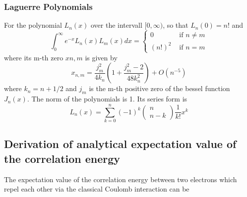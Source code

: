 \documentclass[%
reprint,
amsmath,amssymb,
aps,
]{revtex4-1}
\begin{document}
\subsubsection{Laguerre Polynomials}
For the polynomial $L_n(x)$ over the intervall $[0,\infty)$, so that $L_n(0) = n!$ and
\begin{equation}
\int_{0}^{\infty} e^{-x} L_{n}(x) L_{m}(x) d x=\left\{\begin{array}{ll}{0} & {\text { if } n \neq m} \\ {(n !)^{2}} & {\text { if } n=m}\end{array}\right.
\end{equation}
where its m-th zero $xn,m$ is given by 
\begin{equation}
x_{n, m}=\frac{j_{m}^{2}}{4 k_{n}}\left(1+\frac{j_{m}^{2}-2}{48 k_{n}^{2}}\right)+O\left(n^{-5}\right)
\end{equation}
where $k_n = n + 1/2$ and $j_m$ is the m-th positive zero of the bessel function $J_n(x)$. The norm of the polynomials is 1. 
Its series form is
\begin{equation}
L_{n}(x)=\sum_{k=0}^{n}(-1)^{k}\left(\begin{array}{c}{n} \\ {n-k}\end{array}\right) \frac{1}{k !} x^{k}
\end{equation}

\subsection{Derivation of analytical expectation value of the correlation energy}
The expectation value of the correlation energy between two electrons which repel each other via the classical Coulomb interaction can be 
\end{document}
